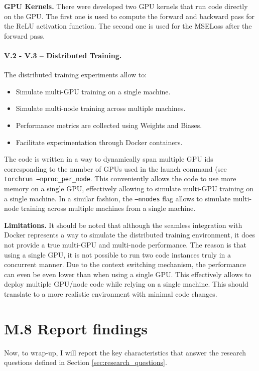 \textbf{GPU Kernels.}
There were developed two GPU kernels that run code directly on the GPU. The first one is used
to compute the forward and backward pass for the ReLU activation function. The second one is used
for the MSELoss after the forward pass.

\paragraph{V.2 - V.3 -- Distributed Training.}
The distributed training experiments allow to:

\begin{itemize}
	\item Simulate multi-GPU training on a single machine.
	\item Simulate multi-node training across multiple machines.
	\item Performance metrics are collected using Weights and Biases.
	\item Facilitate experimentation through Docker containers.
\end{itemize}

The code is written in a way to dynamically span multiple GPU ids corresponding to the number of
GPUs used in the launch command (see \texttt{torchrun --nproc\_per\_node}. This conveniently allows
the code to use more memory on a single GPU, effectively allowing to simulate multi-GPU training on
a single machine. In a similar fashion, the \texttt{--nnodes} flag allows to simulate multi-node
training across multiple machines from a single machine.

\textbf{Limitations.}
It should be noted that although the seamless integration with Docker represents a way to simulate
the distributed training environment, it does not provide a true multi-GPU and multi-node performance.
The reason is that using a single GPU, it is not possible to run two code instances truly in a concurrent manner.
Due to the context switching mechanism, the performance can even be even lower than when using a single GPU.
This effectively allows to deploy multiple GPU/node code while relying on a single machine. This should
translate to a more realistic environment with minimal code changes.

\section{M.8 Report findings}
\label{sec:report-findings}
Now, to wrap-up, I will report the key characteristics that answer the research questions defined
in Section \ref{sec:research_questions}.

